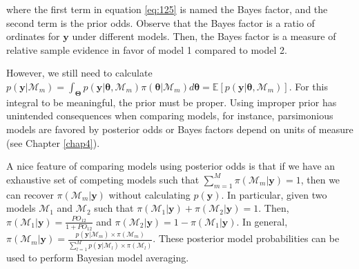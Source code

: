where the first term in equation \ref{eq:125} is named the Bayes factor, and the second term is the prior odds. Observe that the Bayes factor is a ratio of ordinates for $\mathbf{y}$ under different models. Then, the Bayes factor is a measure of relative sample evidence in favor of model 1 compared to model 2. 

However, we still need to calculate $p(\mathbf{y}|\mathcal{M}_m)=\int_{\mathbf{\Theta}}p(\mathbf{y}|\bm{\theta},\mathcal{M}_m)\pi(\bm{\theta}|\mathcal{M}_m)d\bm{\theta}=\mathbb{E}\left[p(\mathbf{y}|\bm{\theta},\mathcal{M}_m)\right]$. For this integral to be meaningful, the prior must be proper. Using improper prior has unintended consequences when comparing models, for instance, parsimonious models are favored by posterior odds or Bayes factors depend on units of measure (see Chapter \ref{chap4}). 

A nice feature of comparing models using posterior odds is that if we have an exhaustive set of competing models such that $\sum_{m=1}^M \pi(\mathcal{M}_m|\mathbf{y})=1$, then we can recover $\pi(\mathcal{M}_m|\mathbf{y})$ without calculating $p(\mathbf{y})$. In particular, given two models $\mathcal{M}_1$ and $\mathcal{M}_2$ such that $\pi(\mathcal{M}_1|\mathbf{y})+\pi(\mathcal{M}_2|\mathbf{y})=1$. Then, $\pi(\mathcal{M}_1|\mathbf{y})=\frac{PO_{12}}{1+PO_{12}}$ and $\pi(\mathcal{M}_2|\mathbf{y})=1-\pi(\mathcal{M}_1|\mathbf{y})$. In general, $\pi(\mathcal{M}_m|\mathbf{y})=\frac{p(\mathbf{y}|\mathcal{M}_m)\times \pi(\mathcal{M}_m)}{\sum_{l=1}^M p(\mathbf{y}|\mathcal{M}_l)\times \pi(\mathcal{M}_l)}$. These posterior model probabilities can be used to perform Bayesian model averaging.

